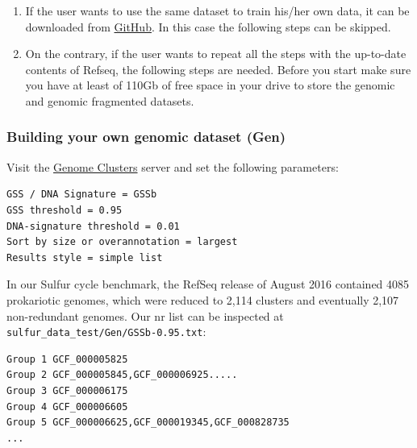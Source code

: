 \documentclass[12pt]{report}
\begin{document}
\begin{enumerate}
\label{gen_release}
\item If the user wants to use the same dataset to train his/her own data, it can be downloaded from \href{https://github.com/eead-csic-compbio/metagenome_Pfam_score/releases/tag/gen_2016}{GitHub}. In this case the following steps can be skipped.  

\item  On the contrary, if the user wants to repeat all the steps with the up-to-date contents of Refseq, the following steps are needed. Before you start make sure you have at least of 110Gb of free space in your drive to store the genomic and genomic fragmented datasets. 
\end{enumerate}
 
 \subsubsection{Building your own genomic dataset (Gen)}
 
Visit the \href{http://microbiome.wlu.ca/research/redundancy/redundancy.cgi}{Genome Clusters} server and set the following parameters:
\begin{verbatim}
GSS / DNA Signature = GSSb
GSS threshold = 0.95
DNA-signature threshold = 0.01
Sort by size or overannotation = largest
Results style = simple list
\end{verbatim}

In our Sulfur cycle benchmark, the RefSeq release of August 2016 contained 4085 prokariotic genomes, which were reduced to 2,114 clusters and eventually 2,107 non-redundant genomes. %
Our nr list can be inspected at \verb+sulfur_data_test/Gen/GSSb-0.95.txt+:
\begin{verbatim}
Group 1 GCF_000005825
Group 2 GCF_000005845,GCF_000006925.....
Group 3 GCF_000006175
Group 4 GCF_000006605
Group 5 GCF_000006625,GCF_000019345,GCF_000828735
...
\end{verbatim}
\end{document}
